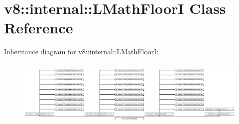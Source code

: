 \hypertarget{classv8_1_1internal_1_1_l_math_floor_i}{}\section{v8\+:\+:internal\+:\+:L\+Math\+FloorI Class Reference}
\label{classv8_1_1internal_1_1_l_math_floor_i}
Inheritance diagram for v8\+:\+:internal\+:\+:L\+Math\+FloorI\+:\begin{figure}[H]
\begin{center}
\leavevmode
\includegraphics[height=3.271375cm]{classv8_1_1internal_1_1_l_math_floor_i}
\end{center}
\end{figure}
